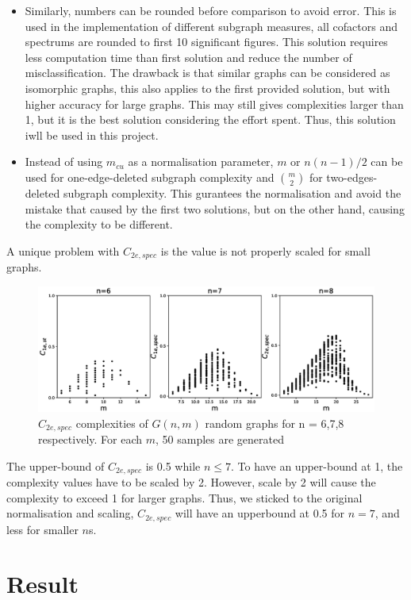 \documentclass[12pt]{article}
\begin{document}
{\begin{itemize}
    \item Similarly, numbers can be rounded before comparison to avoid error. This is used in the implementation of different subgraph measures, all cofactors and spectrums are rounded to first 10 significant figures. This solution requires less computation time than first solution and reduce the number of misclassification. The drawback is that similar graphs can be considered as isomorphic graphs, this also applies to the first provided solution, but with higher accuracy for large graphs. This may still gives complexities larger than 1, but it is the best solution considering the effort spent. Thus, this solution iwll be used in this project.
    \item Instead of using $m_{cu}$ as a normalisation parameter, $m$ or $n(n-1)/2$ can be used for one-edge-deleted subgraph complexity and $\genfrac(){0pt}{2}{m}{2}$ for two-edges-deleted subgraph complexity. This gurantees the normalisation and avoid the mistake that caused by the first two solutions, but on the other hand, causing the complexity to be different.
\end{itemize}
A unique problem with $C_{2e,spec}$ is the value is not properly scaled for small graphs.

\begin{figure}[ht]
    \includegraphics[width = \textwidth]{c2espec.eps}
    \caption{$C_{2e,spec}$ complexities of $G(n,m)$ random graphs for n = 6,7,8 respectively. For each $m$, 50 samples are generated}
    \label{fig:c2espec}
    \centering
\end{figure}
\noindent
The upper-bound of $C_{2e,spec}$ is 0.5 while $ n\leq7 $. To have an upper-bound at 1, the complexity values have to be scaled by 2. However, scale by 2 will cause the complexity to exceed 1 for larger graphs. Thus, we sticked to the original normalisation and scaling, $C_{2e,spec}$ will have an upperbound at 0.5 for $n=7$, and less for smaller $n$s.

\section{Result}
}
\end{document}
